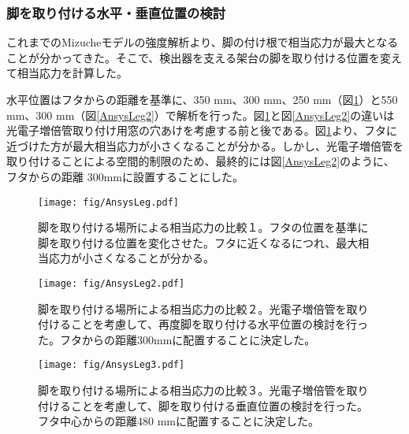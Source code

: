 \documentclass[11pt]{ltjsreport}
\newcommand{\figref}[1]{図\ref{#1}}
\begin{document}
\subsubsection{脚を取り付ける水平・垂直位置の検討}
これまでのMizucheモデルの強度解析より、脚の付け根で相当応力が最大となることが分かってきた。そこで、検出器を支える架台の脚を取り付ける位置を変えて相当応力を計算した。

水平位置はフタからの距離を基準に、350 mm、300 mm、250 mm（\figref{AnsysLeg1}）と550 mm、300 mm（\figref{AnsysLeg2}）で解析を行った。\figref{AnsysLeg1}と\figref{AnsysLeg2}の違いは光電子増倍管取り付け用窓の穴あけを考慮する前と後である。\figref{AnsysLeg1}より、フタに近づけた方が最大相当応力が小さくなることが分かる。しかし、光電子増倍管を取り付けることによる空間的制限のため、最終的には\figref{AnsysLeg2}のように、フタからの距離 300mmに設置することにした。


\begin{figure}[htbp]
\centering
\texttt{[image: fig/AnsysLeg.pdf]}
\caption[脚を取り付ける場所による相当応力の比較１]{脚を取り付ける場所による相当応力の比較１。フタの位置を基準に脚を取り付ける位置を変化させた。フタに近くなるにつれ、最大相当応力が小さくなることが分かる。}
\label{AnsysLeg1}
\end{figure}

\begin{figure}[htbp]
\begin{minipage}{0.47\textwidth}
\centering
\texttt{[image: fig/AnsysLeg2.pdf]}
\caption[脚を取り付ける場所による相当応力の比較２]{脚を取り付ける場所による相当応力の比較２。光電子増倍管を取り付けることを考慮して、再度脚を取り付ける水平位置の検討を行った。フタからの距離300mmに配置することに決定した。}
\label{AnsysLeg2}
\end{minipage}
\hfill
\begin{minipage}{0.47\textwidth}
\centering
\texttt{[image: fig/AnsysLeg3.pdf]}
\caption[脚を取り付ける場所による相当応力の比較３]{脚を取り付ける場所による相当応力の比較３。光電子増倍管を取り付けることを考慮して、脚を取り付ける垂直位置の検討を行った。フタ中心からの距離480 mmに配置することに決定した。}
\label{AnsysLeg3}
\end{minipage}
\end{figure}
\end{document}
